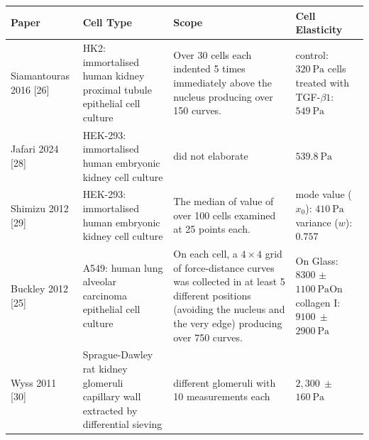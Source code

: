 \documentclass[
  paper=a4,
  ,captions=tableheading
]{scrartcl}
\begin{document}
\begin{longtable}[]{@{}
  >{\raggedright\arraybackslash}p{}
  >{\raggedright\arraybackslash}p{}
  >{\raggedright\arraybackslash}p{}
  >{\raggedright\arraybackslash}p{}@{}}
\toprule\noalign{}
\begin{minipage}[b]{\linewidth}\raggedright
Paper
\end{minipage} & \begin{minipage}[b]{\linewidth}\raggedright
Cell Type
\end{minipage} & \begin{minipage}[b]{\linewidth}\raggedright
Scope
\end{minipage} & \begin{minipage}[b]{\linewidth}\raggedright
Cell Elasticity
\end{minipage} \\
\midrule\noalign{}
\endhead
\bottomrule\noalign{}
\endlastfoot
Siamantouras 2016 {[}26{]} & HK2: immortalised human kidney proximal
tubule epithelial cell culture & Over 30 cells each indented 5 times
immediately above the nucleus producing over 150 curves. & control:
\(320 \ \text{Pa}\) cells treated with TGF-\(\beta 1\):
\(549 \ \text{Pa}\) \\
Jafari 2024 {[}28{]} & HEK-293: immortalised human embryonic kidney cell
culture & did not elaborate & \(539.8 \ \text{Pa}\) \\
Shimizu 2012 {[}29{]} & HEK-293: immortalised human embryonic kidney
cell culture & The median of value of over 100 cells examined at 25
points each. & mode value (\(x_{0}\)): \(410 \ \text{Pa}\) variance
(\(w\)): \(0.757\) \\
Buckley 2012 {[}25{]} & A549: human lung alveolar carcinoma epithelial
cell culture & On each cell, a \(4 \times 4\) grid of force-distance
curves was collected in at least 5 different positions (avoiding the
nucleus and the very edge) producing over 750 curves. & On Glass: 8300
\(\pm\) \(1100 \ \text{Pa}\)On collagen I: \(9100 \ \pm\)
\(2900 \ \text{Pa}\) \\
Wyss 2011 {[}30{]} & Sprague-Dawley rat kidney glomeruli capillary wall
extracted by differential sieving & 10 different glomeruli with 10
measurements each & \(2,300 \ \pm\) \(160 \ \text{Pa}\) \\
\end{longtable}
\end{document}
